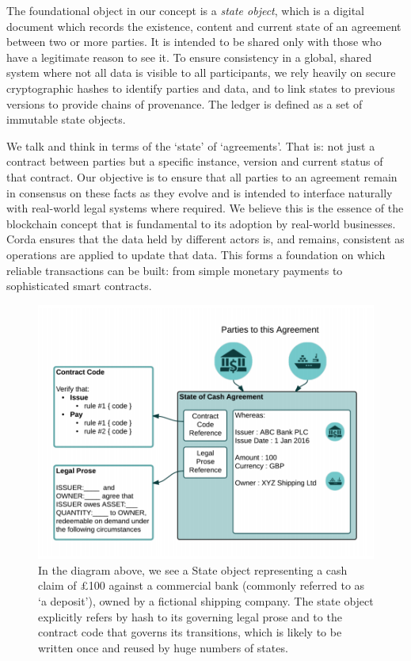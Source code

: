 \documentclass{article}
\begin{document}
The foundational object in our concept is a \textit{state object}, which is a digital document which records the existence, content and current state of an agreement between two or more parties. It is intended to be shared only with those who have a legitimate reason to see it. To ensure consistency in a global, shared system where not all data is visible to all participants, we rely heavily on secure cryptographic hashes to identify parties and data, and to link states to previous versions to provide chains of provenance. The ledger is defined as a set of immutable state objects.

We talk and think in terms of the `state' of `agreements'. That is: not just a contract between parties but a specific instance, version and current status of that contract. Our objective is to ensure that all parties to an agreement remain in consensus on these facts as they evolve and is intended to interface naturally with real-world legal systems where required. We believe this is the essence of the blockchain concept that is fundamental to its adoption by real-world businesses. Corda ensures that the data held by different actors is, and remains, consistent as operations are applied to update that data. This forms a foundation on which reliable transactions can be built: from simple monetary payments to sophisticated smart contracts.

\begin{figure}[H]
\includegraphics[scale = .4, center]{partiesto}
\caption{In the diagram above, we see a State object representing a cash claim of \pounds100 against a commercial bank (commonly referred to as `a deposit'), owned by a fictional shipping company. The state object explicitly refers by hash to its governing legal prose and to the contract code that governs its transitions, which is likely to be written once and reused by huge numbers of states.}
\end{figure}
\end{document}
